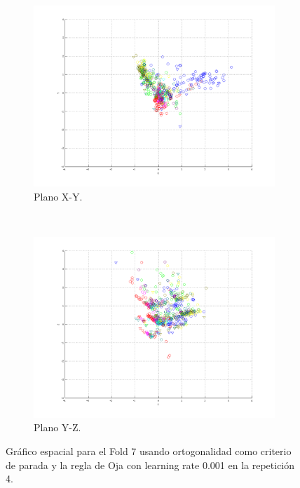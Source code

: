 \documentclass[informe.tex]{subfiles}
\begin{document}
\begin{figure}[H]
        \hspace*{-6.5cm}
        \begin{subfigure}[b]{0.49\textwidth}
                \includegraphics[width=\textwidth]{graficos/fold7_criterioParadao_reglaM_alpha0_rep4_2XY.png}
                \caption{Plano X-Y.}
        \end{subfigure}
        ~
        \begin{subfigure}[b]{0.49\textwidth}
                \includegraphics[width=\textwidth]{graficos/fold7_criterioParadao_reglaM_alpha0_rep4_3YZ.png}
                \caption{Plano Y-Z.}
        \end{subfigure}
	\restoregeometry
        \caption{Gráfico espacial para el Fold 7 usando ortogonalidad como criterio de parada y la regla de Oja con learning rate 0.001 en la repetición 4.}
        \label{fig:fold7_criterioParadao_reglaM_alpha0_rep4}
	\end{figure}
      
\end{document}
